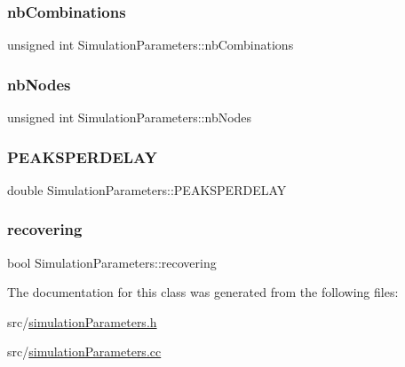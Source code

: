 \subsubsection{\texorpdfstring{nb\+Combinations}{nbCombinations}}
{\footnotesize\ttfamily unsigned int Simulation\+Parameters\+::nb\+Combinations}

\mbox{\label{class_simulation_parameters_a96391a1b611de11ca4d0babba7117872}} 
\subsubsection{\texorpdfstring{nb\+Nodes}{nbNodes}}
{\footnotesize\ttfamily unsigned int Simulation\+Parameters\+::nb\+Nodes}

\mbox{\label{class_simulation_parameters_a57cd536ac7c057b5c2d5c85faa4d846d}} 
\subsubsection{\texorpdfstring{P\+E\+A\+K\+S\+P\+E\+R\+D\+E\+L\+AY}{PEAKSPERDELAY}}
{\footnotesize\ttfamily double Simulation\+Parameters\+::\+P\+E\+A\+K\+S\+P\+E\+R\+D\+E\+L\+AY}

\mbox{\label{class_simulation_parameters_a637db4137ba6b25de7e75db1582d6532}} 
\subsubsection{\texorpdfstring{recovering}{recovering}}
{\footnotesize\ttfamily bool Simulation\+Parameters\+::recovering}



The documentation for this class was generated from the following files\+:\begin{DoxyCompactItemize}
\item 
src/\hyperlink{simulation_parameters_8h}{simulation\+Parameters.\+h}\item 
src/\hyperlink{simulation_parameters_8cc}{simulation\+Parameters.\+cc}\end{DoxyCompactItemize}
